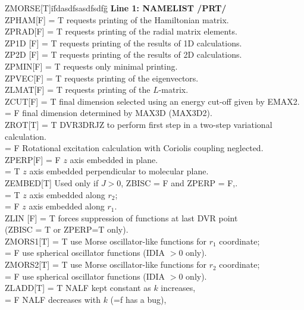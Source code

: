 \documentclass{elsart}
\begin{document}
\begin{tabbing}
ZMORSE[T]i\=    fdasdfsasdfsdfg\=   \=             \kill
{\bf Line 1: NAMELIST /PRT/} \\
ZPHAM[F] \> = T requests printing of the Hamiltonian matrix.\\
ZPRAD[F] \> = T requests printing of the radial matrix elements.\\
ZP1D [F] \> = T requests printing of the results of 1D calculations.\\
ZP2D [F] \> = T requests printing of the results of 2D calculations.\\
ZPMIN[F]\> = T requests only minimal printing.\\
ZPVEC[F]\> = T requests printing of the eigenvectors.\\
ZLMAT[F]\> = T requests printing of the $L$-matrix.\\
ZCUT[F] \> = T final dimension selected using an energy cut-off given by
EMAX2.\\
         \> = F final dimension determined by MAX3D (MAX3D2).\\
ZROT[T] \> = T DVR3DRJZ to perform first step in a two-step variational
calculation.\\
         \> = F Rotational excitation calculation with Coriolis coupling
neglected.\\
ZPERP[F] \> = F  $z$ axis embedded in plane.\\
         \> = T  $z$ axis embedded perpendicular to molecular plane.\\
ZEMBED[T]\>  Used only if $ J > 0$, ZBISC = F and ZPERP = F,.\\
        \> = T $z$ axis embedded along $r_2$;\\
        \> = F $z$ axis embedded along $r_1$.\\
ZLIN [F]\> = T forces suppression of functions at last DVR point\\
        \> (ZBISC = T or ZPERP=T only).\\
ZMORS1[T]\> = T use Morse oscillator-like functions for $r_1$ coordinate;\\
         \> = F use spherical oscillator functions (IDIA $> 0$ only).\\
ZMORS2[T]\> = T use Morse oscillator-like functions for $r_2$ coordinate;\\
         \> = F use spherical oscillator functions (IDIA $> 0$ only).\\
ZLADD[T] \> = T NALF kept constant as $k$ increases,\\
         \> = F NALF decreases with $k$ (=f has a bug),\\

\end{tabbing}
\end{document}
